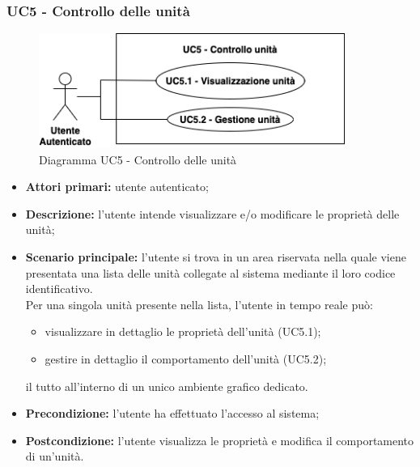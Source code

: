 \subsubsection{UC5 - Controllo delle unità}
\begin{figure}[h!]
    \centering
    \includegraphics[width=10cm]{images/uc5.png}
    \caption{Diagramma UC5 - Controllo delle unità}
\end{figure}
\begin{itemize}
    \item \textbf{Attori primari:} utente autenticato;
    \item \textbf{Descrizione:} l'utente intende visualizzare e/o modificare le proprietà delle unità;
    \item \textbf{Scenario principale:} l'utente si trova in un area riservata nella quale viene presentata una lista delle unità collegate al sistema mediante il loro codice identificativo.\\
    Per una singola unità presente nella lista, l'utente in tempo reale può:
    \begin{itemize}
        \item visualizzare in dettaglio le proprietà dell'unità (UC5.1);
        \item gestire in dettaglio il comportamento dell'unità (UC5.2);
    \end{itemize}
    il tutto all'interno di un unico ambiente grafico dedicato.
    \item \textbf{Precondizione:} l'utente ha effettuato l'accesso al sistema;
    \item \textbf{Postcondizione:} l'utente visualizza le proprietà e modifica il comportamento di un'unità.
\end{itemize}
\newpage
